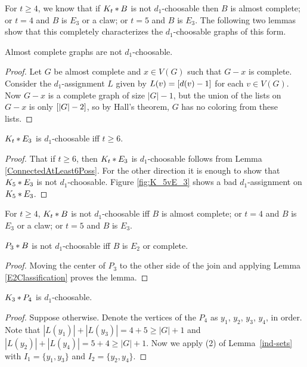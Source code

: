 For $t \geq 4$, we know that if $K_t \mbox{\hspace{2 pt}$\ast$\hspace{2 pt}} B$ is not $d_1$-choosable then $B$ is almost complete; or $t = 4$ and $B$ is $E_3$ or a claw; or $t = 5$ and $B$ is $E_3$.  The following two lemmas show that this completely characterizes the $d_1$-choosable graphs of this form.

\begin{lem}\label{AlmostCompleteGraphsNotD1}
Almost complete graphs are not $d_1$-choosable.
\end{lem}
\begin{proof}
Let $G$ be almost complete and $x \in V(G)$ such that $G-x$ is complete.  Consider the $d_1$-assignment $L$ given by $L(v) = \left[d(v) - 1\right]$ for each $v \in V(G)$.  
Now $G-x$ is a complete graph of size $|G|-1$, but the union of the lists on
$G-x$ is only $\left[|G|-2\right]$, so by Hall's theorem, $G$ has no coloring from
these lists.
\end{proof}



\begin{lem}
$K_t \mbox{\hspace{2 pt}$\ast$\hspace{2 pt}} E_3$ is $d_1$-choosable iff $t \geq 6$.
\label{K_tLemma}
\end{lem}
\begin{proof}
That if $t \geq 6$, then $K_t \mbox{\hspace{2 pt}$\ast$\hspace{2 pt}} E_3$ is $d_1$-choosable follows from Lemma \ref{ConnectedAtLeast6Poss}.  For the other direction it is enough to show that $K_5 \mbox{\hspace{2 pt}$\ast$\hspace{2 pt}} E_3$ is not $d_1$-choosable.  Figure \ref{fig:K_5vE_3} shows a bad $d_1$-assignment on $K_5 \mbox{\hspace{2 pt}$\ast$\hspace{2 pt}} E_3$.
\end{proof}

\begin{cor}\label{K_tClassification}
For $t \geq 4$, $K_t \mbox{\hspace{2 pt}$\ast$\hspace{2 pt}} B$ is not $d_1$-choosable iff $B$ is almost complete; or $t = 4$ and $B$ is $E_3$ or a claw; or $t = 5$ and $B$ is $E_3$.
\end{cor}
\begin{lem}\label{P3Classification}
$P_3 \mbox{\hspace{2 pt}$\ast$\hspace{2 pt}} B$ is not $d_1$-choosable iff $B$ is $E_2$ or complete.
\end{lem}
\begin{proof}
Moving the center of $P_3$ to the other side of the join and applying Lemma
\ref{E2Classification} proves the lemma.
\end{proof}

\begin{lem}\label{AJoinP_4}\label{K3P4}
$K_3 \mbox{\hspace{2 pt}$\ast$\hspace{2 pt}} P_4$ is $d_1$-choosable.
\end{lem}
\begin{proof}
Suppose otherwise.  Denote the vertices of the $P_4$ as $y_1$, $y_2$, $y_3$,
$y_4$, in order.  Note that $|L(y_1)|+|L(y_3)|=4+5\ge |G|+1$ and
$|L(y_2)|+|L(y_4)|=5+4\ge |G|+1$.  Now we apply (2) of Lemma~\ref{ind-sets}
with $I_1=\{y_1,y_3\}$ and $I_2=\{y_2,y_4\}$.
\end{proof}

